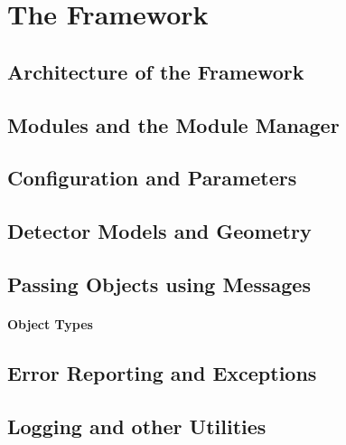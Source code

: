 \section{The \apsq Framework}
\subsection{Architecture of the Framework}
\subsection{Modules and the Module Manager}
\subsection{Configuration and Parameters}
\subsection{Detector Models and Geometry}
\subsection{Passing Objects using Messages}
\paragraph{Object Types}
\subsection{Error Reporting and Exceptions}
\subsection{Logging and other Utilities}
